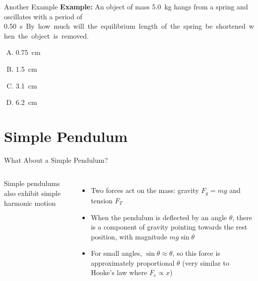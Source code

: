 \documentclass[12pt,compress,aspectratio=169]{beamer}
\begin{document}
\begin{frame}{Another Example}
  \textbf{Example:} An object of mass \SI{5.0}{\kilo\gram} hangs from a spring
  and oscillates with a period of \SI{0.50}\second. By how much will the
  equilibrium length of the spring be shortened when the object is removed.
  \begin{enumerate}[(A)]
  \item\SI{.75}{\centi\metre}
  \item\SI{1.5}{\centi\metre}
  \item\SI{3.1}{\centi\metre}
  \item\SI{6.2}{\centi\metre}
  \end{enumerate}
\end{frame}



\section{Simple Pendulum}

\begin{frame}{What About a Simple Pendulum?}
  \begin{columns}
    Simple pendulums also exhibit simple harmonic motion
    \begin{itemize}
    \item Two forces act on the mass: gravity $F_g=mg$ and tension $F_T$
    \item When the pendulum is deflected by an angle $\theta$, there is a
      component of gravity pointing towards the rest position, with magnitude
      $mg\sin\theta$
    \item For small angles, $\sin\theta\approx\theta$, so this force is
      approximately proportional $\theta$ (very similar to Hooke's law where
      $F_e\propto x$)
    \end{itemize}

  \end{columns}
\end{frame}
\end{document}
